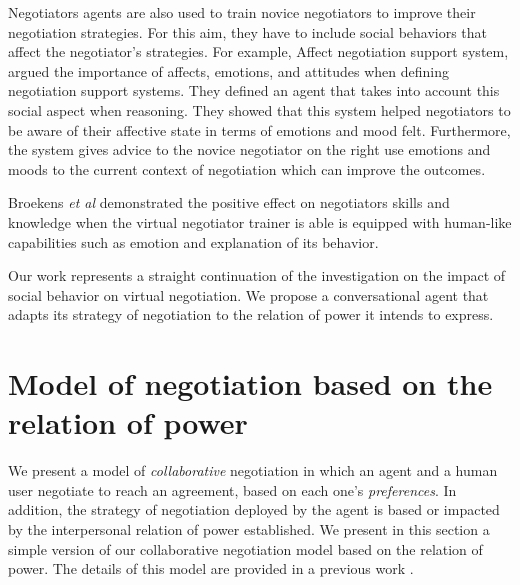 \documentclass[runningheads,a4paper]{llncs}
\begin{document}
			  
			 Negotiators agents are also used to train novice negotiators to improve their negotiation strategies. For this aim, they have to include social behaviors that affect the negotiator's strategies. For example, Affect negotiation support system\cite{broekens2010affective}, argued the importance of affects, emotions, and attitudes when defining negotiation support systems. They defined an agent that takes into account this social aspect when reasoning.
			They showed that this system helped negotiators to be aware of their affective state in terms of emotions and mood felt. Furthermore, the system gives advice to the novice negotiator on the right use emotions and moods to the current context of negotiation which can improve the outcomes.
		
			Broekens \textit{et al} \cite{broekens2012virtual} demonstrated the positive effect on negotiators skills and knowledge when the virtual negotiator trainer is able is equipped with human-like capabilities such as emotion and explanation of its behavior. 
		
		
			Our work represents a straight continuation of the investigation on the impact of social behavior on virtual negotiation. We propose a conversational agent that adapts its strategy of negotiation to the relation of power it intends to express. 
			
			
			 
			

	
	\section{Model of negotiation based on the relation of power}
	We present a model of \textit{collaborative} negotiation in which an agent and a human user negotiate to reach an agreement, based on each one's \textit{preferences}. In addition, the strategy of negotiation deployed by the agent is based or impacted by the interpersonal relation of power established.
	We present in this section a simple version of our collaborative negotiation model based on the relation of power. The details of this model are  provided in a previous work \cite{ouali2017computational}.
\end{document}
